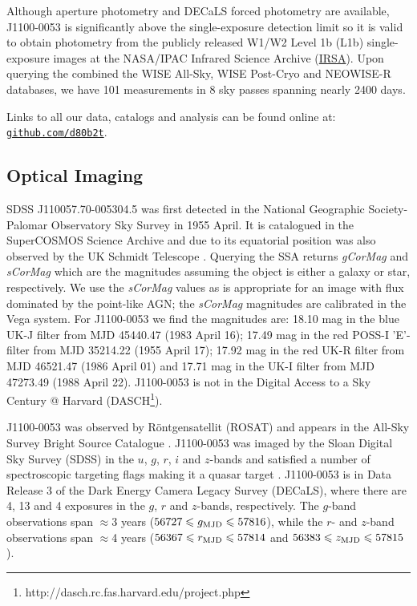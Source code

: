 \documentclass[a4paper,fleqn,usenatbib]{mnras}
\begin{document}
Although aperture photometry and DECaLS forced photometry
\citep{Lang2014, Meisner2017a, Meisner2017b} are available, J1100-0053
is significantly above the single-exposure detection limit so it is
valid to obtain photometry from the publicly released W1/W2 Level 1b
(L1b) single-exposure images at the NASA/IPAC Infrared Science Archive
(\href{http://irsa.ipac.caltech.edu/}{IRSA}).  Upon querying the
combined the WISE All-Sky, WISE Post-Cryo and NEOWISE-R databases, we
have 101 measurements in 8 sky passes spanning nearly 2400 days.

Links to all our data, catalogs and analysis can be found
online at: \href{https://github.com/d80b2t}{{\tt github.com/d80b2t}}.


\subsection{Optical Imaging}
SDSS J110057.70-005304.5 was first detected in the National Geographic
Society-Palomar Observatory Sky Survey \cite[NGS-POSS; ][]{Abell1959,
Minkowski_Abell1963book} in 1955 April. It is catalogued in the
SuperCOSMOS Science Archive \citep[\href{http://ssa.roe.ac.uk/}{SSA};
][]{Hambly2001_I, Hambly2001_II} and due to its equatorial position
was also observed by the UK Schmidt Telescope \cite[UKST;
][]{Cannon1975, Cannon1979book}. Querying the SSA returns {\it
gCorMag} and {\it sCorMag} which are the magnitudes assuming the
object is either a galaxy or star, respectively. We use the {\it
sCorMag} values as is appropriate for an image with flux dominated by
the point-like AGN; the {\it sCorMag} magnitudes are calibrated in the
Vega system. For J1100-0053 we find the magnitudes are: 18.10 mag in
the blue UK-J filter from MJD 45440.47 (1983 April 16); 17.49 mag in
the red POSS-I 'E'-filter from MJD 35214.22 (1955 April 17); 17.92 mag
in the red UK-R filter from MJD 46521.47 (1986 April 01) and 17.71 mag
in the UK-I filter from MJD 47273.49 (1988 April 22). J1100-0053 is
not in the Digital Access to a Sky Century @ Harvard
(DASCH\footnote{http://dasch.rc.fas.harvard.edu/project.php}).

J1100-0053 was observed by R\"{o}ntgensatellit (ROSAT) and appears in
the All-Sky Survey Bright Source Catalogue \citep[RASS-BSC;
][]{Appenzeller1998, Voges1999}.  J1100-0053 was imaged by the Sloan
Digital Sky Survey (SDSS) in the $u$, $g$, $r$, $i$ and $z$-bands and
satisfied a number of spectroscopic targeting flags making it a quasar
target \citep{Richards2002}.  J1100-0053 is in Data Release 3
\citep[DR3; ][]{Dey2018} of the Dark Energy Camera Legacy Survey
(DECaLS), where there are 4, 13 and 4 exposures in the $g$, $r$ and
$z$-bands, respectively. The $g$-band observations span $\approx$3 years
($56727 \leq g_{\rm MJD} \leq 57816$), while the $r$- and $z$-band
observations span $\approx$4 years ($56367 \leq r_{\rm MJD} \leq
57814$ and $56383 \leq z_{\rm MJD} \leq 57815$).
\end{document}
